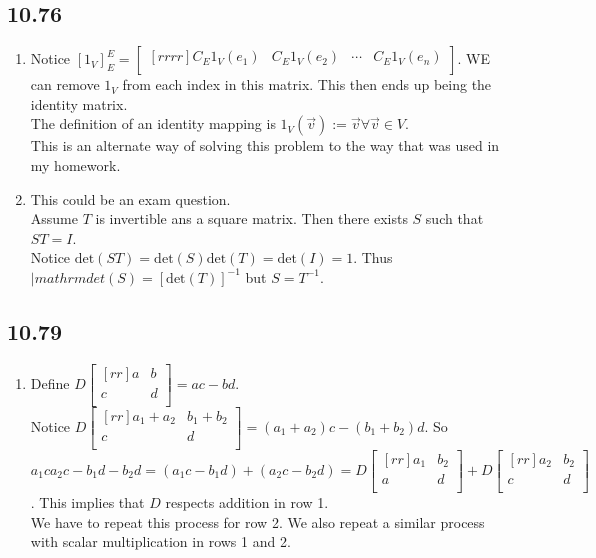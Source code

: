 \documentclass{report}
\theoremstyle{plain}
\theoremstyle{definition}
\theoremstyle{plain}
\begin{document}
\subsection{10.76}
\begin{enumerate}
\item Notice $[1_V]_E^E=\begin{bmatrix}[rrrr]C_E1_V(e_1)&C_E1_V(e_2)&\cdots &C_E1_V(e_n)\\\end{bmatrix}$. WE can remove $1_V$ from each index in this matrix. This then ends up being the identity matrix.\\
The definition of an identity mapping is $1_V(\vec{v}):=\vec{v}\forall\vec{v}\in V$.\\
This is an alternate way of solving this problem to the way that was used in my homework.
\item This could be an exam question.\\
Assume $T$ is invertible ans a square matrix. Then there exists $S$ such that $ST=I$.\\
Notice $\mathrm{det}(ST)=\mathrm{det}(S)\mathrm{det}(T)=\mathrm{det}(I)=1$. Thus $|mathrm{det}(S)=[\mathrm{det}(T)]^{-1}$ but $S=T^{-1}$.
\end{enumerate}
\subsection{10.79}
\begin{enumerate}
\item Define $D\begin{bmatrix}[rr]a&b\\c&d\\\end{bmatrix}=ac-bd$.\\
Notice $D\begin{bmatrix}[rr]a_1+a_2&b_1+b_2\\c&d\\\end{bmatrix}=(a_1+a_2)c-(b_1+b_2)d$. So $a_1ca_2c-b_1d-b_2d=(a_1c-b_1d)+(a_2c-b_2d) = D\begin{bmatrix}[rr]a_1&b_2\\a&d\\\end{bmatrix}+D\begin{bmatrix}[rr]a_2&b_2\\c&d\\\end{bmatrix}$. This implies that $D$ respects addition in row 1.\\
We have to repeat this process for row 2. We also repeat a similar process with scalar multiplication in rows 1 and 2.
\end{enumerate}
\end{document}

